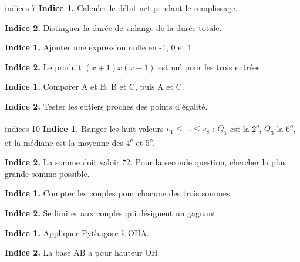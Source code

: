 \begin{blocEdition}{indices-7}
\textbf{Indice 1.} Calculer le débit net pendant le remplissage.\par\medskip\textbf{Indice 2.} Distinguer la durée de vidange de la durée totale.\par
{}\textbf{Indice 1.} Ajouter une expression nulle en -1, 0 et 1.\par\medskip\textbf{Indice 2.} Le produit $(x+1)x(x-1)$ est nul pour les trois entrées.\par
{}\textbf{Indice 1.} Comparer A et B, B et C, puis A et C.\par\medskip\textbf{Indice 2.} Tester les entiers proches des points d’égalité.\par

\end{blocEdition}
\begin{blocEdition}{indices-10}
\textbf{Indice 1.} Ranger les huit valeurs $v_1\le\dots\le v_8$ : $Q_1$ est la 2\textsuperscript{e}, $Q_3$ la 6\textsuperscript{e}, et la médiane est la moyenne des 4\textsuperscript{e} et 5\textsuperscript{e}.\par\medskip\textbf{Indice 2.} La somme doit valoir 72. Pour la seconde question, chercher la plus grande somme possible.\par
{}\textbf{Indice 1.} Compter les couples pour chacune des trois sommes.\par\medskip\textbf{Indice 2.} Se limiter aux couples qui désignent un gagnant.\par
{}\textbf{Indice 1.} Appliquer Pythagore à OHA.\par\medskip\textbf{Indice 2.} La base AB a pour hauteur OH.\par

\end{blocEdition}
